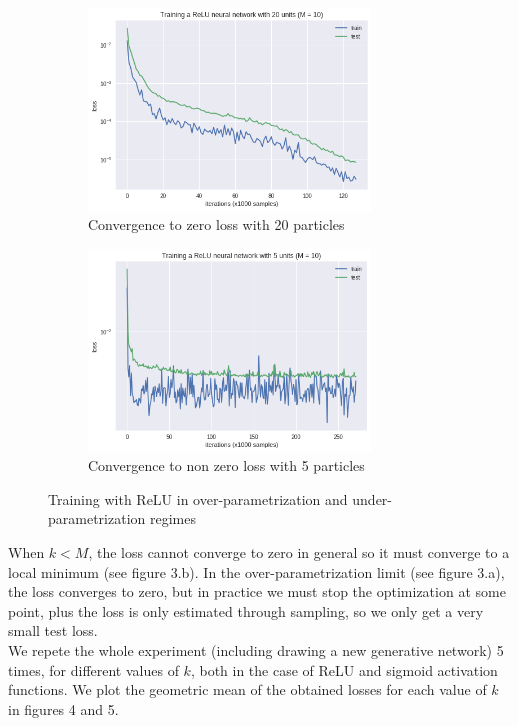 \documentclass[a4paper, 11pt]{scrartcl}
\begin{document}
{\begin{figure}[H]
\centering
\begin{subfigure}{.5\textwidth}
  \centering
  \includegraphics[width=7.5cm]{over.png}
  \caption{Convergence to zero loss with 20 particles}
  \label{fig:sub3}
\end{subfigure}%
\begin{subfigure}{.5\textwidth}
  \centering
  \includegraphics[width=7.5cm]{under.png}
  \caption{Convergence to non zero loss with 5 particles}
  \label{fig:sub4}
\end{subfigure}%
  \caption{Training with ReLU in over-parametrization and under-parametrization regimes}
\end{figure}


When $k < M$, the loss cannot converge to zero in general so it must converge to a local minimum (see figure 3.b). In the over-parametrization limit (see figure 3.a), the loss converges to zero, but in practice we must stop the optimization at some point, plus the loss is only estimated through sampling, so we only get a very small test loss. \\

We repete the whole experiment (including drawing a new generative network) 5 times, for different values of $k$, both in the case of ReLU and sigmoid activation functions. We plot the geometric mean of the obtained losses for each value of $k$ in figures 4 and 5.

}
\end{document}
